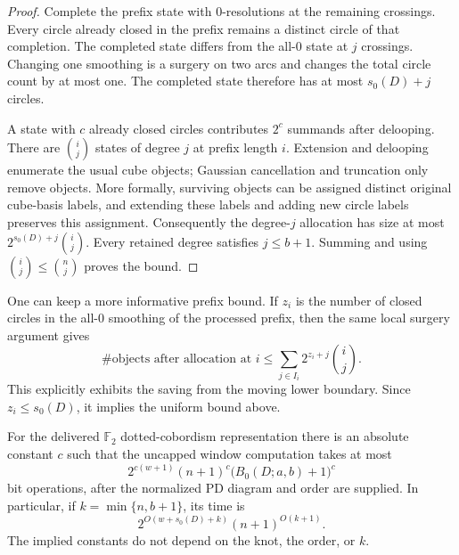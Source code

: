 \begin{proof}
Complete the prefix state with $0$-resolutions at the remaining crossings.
Every circle already closed in the prefix remains a distinct circle of
that completion.  The completed state differs from the all-$0$ state at
$j$ crossings.  Changing one smoothing is a surgery on two arcs and changes
the total circle count by at most one.  The completed state therefore has
at most $s_0(D)+j$ circles.

A state with $c$ already closed circles contributes $2^c$ summands after
delooping.  There are $\binom{i}{j}$ states of degree $j$ at prefix length
$i$.  Extension and delooping enumerate the usual cube objects; Gaussian
cancellation and truncation only remove objects.  More formally, surviving
objects can be assigned distinct original cube-basis labels, and extending
these labels and adding new circle labels preserves this assignment.
Consequently the degree-$j$ allocation has size at most
$2^{s_0(D)+j}\binom{i}{j}$.  Every retained degree satisfies
$j\leq b+1$.  Summing and using $\binom{i}{j}\leq\binom{n}{j}$ proves the
bound.
\end{proof}

One can keep a more informative prefix bound.  If $z_i$ is the number of
closed circles in the all-$0$ smoothing of the processed prefix, then the
same local surgery argument gives
\begin{equation}
 \#\text{objects after allocation at }i
 \leq\sum_{j\in I_i}2^{z_i+j}\binom{i}{j}.
 \label{eq:prefix-window-bound}
\end{equation}
This explicitly exhibits the saving from the moving lower boundary.
Since $z_i\leq s_0(D)$, it implies the uniform bound above.

\begin{theorem}
\label{thm:window-cost}
For the delivered $\mathbb F_2$ dotted-cobordism representation there is an
absolute constant $c$ such that the uncapped window computation takes at
most
\begin{equation}
 2^{c(w+1)}(n+1)^c\bigl(B_0(D;a,b)+1\bigr)^c
 \label{eq:window-cost-exact}
\end{equation}
bit operations, after the normalized PD diagram and order are supplied.
In particular, if $k=\min\{n,b+1\}$, its time is
\begin{equation}
 2^{O(w+s_0(D)+k)}(n+1)^{O(k+1)}.
 \label{eq:window-cost-asymptotic}
\end{equation}
The implied constants do not depend on the knot, the order, or $k$.
\end{theorem}

